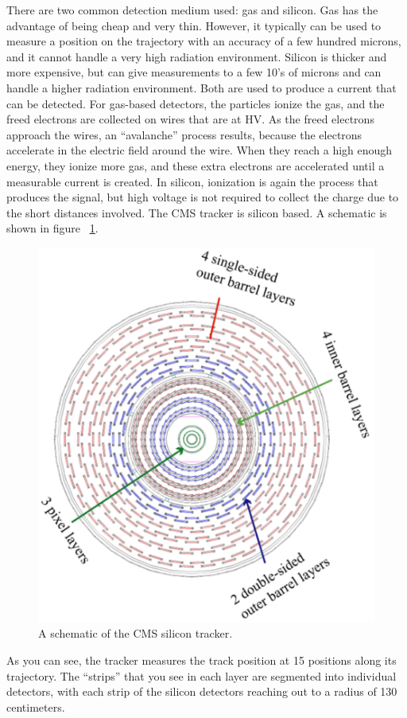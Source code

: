 There are two common detection medium used: gas and silicon.  Gas has the advantage of being cheap and very thin.  However, it typically can be used to measure a position on the trajectory with an accuracy of a few hundred microns, and it cannot handle a very high radiation environment.  Silicon is thicker and more expensive, but can give measurements to a few 10's of microns and can handle a higher radiation environment.  Both are used to produce a current that can be detected.  For gas-based detectors, the particles ionize the gas, and the freed electrons are collected on wires that are at HV.  As the freed electrons approach the wires, an ``avalanche''  process results, because the electrons accelerate in the electric field around the wire.  When they reach a high enough energy, they ionize more gas, and these extra electrons are accelerated until a measurable current is created. In silicon, ionization is again the process that produces the signal, but high voltage is not required to collect the charge due to the short distances involved.
\noindent
The CMS tracker is silicon based.  A schematic is shown in figure ~\ref{fig:trk3}.

\begin{figure}[h]
\centering\includegraphics[scale=0.5]{./Trackers/Pictures/fig3.pdf}
\caption{ A schematic of the CMS silicon tracker.}
\label{fig:trk3}
\end{figure}
\noindent
As you can see, the tracker measures the track position at 15 positions along its trajectory. The ``strips'' that you see in each layer are segmented into individual detectors, with each strip of the silicon detectors reaching out to a radius of 130 centimeters. 
